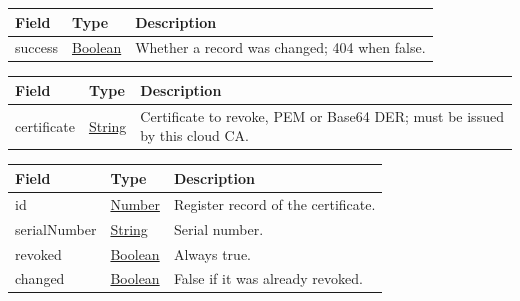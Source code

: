 \documentclass[a4paper]{arrowhead}
\newcommand{\pref}[1]{{\textcolor{ArrowheadGrey}{\hyperref[sec:model:primitives:#1]{#1}}}}
\begin{document}




\noindent\begin{tabularx}{\textwidth}{| >{\raggedright\arraybackslash}p{3.9cm} | >{\raggedright\arraybackslash\small}p{5.3cm} | X |} \hline
\rowcolor{gray!33} Field & Type & Description \\ \hline
success & \pref{Boolean} & Whether a record was changed; 404 when false. \\ \hline
\end{tabularx}







\noindent\begin{tabularx}{\textwidth}{| >{\raggedright\arraybackslash}p{3.9cm} | >{\raggedright\arraybackslash\small}p{5.3cm} | X |} \hline
\rowcolor{gray!33} Field & Type & Description \\ \hline
certificate & \pref{String} & Certificate to revoke, PEM or Base64 DER; must be issued by this cloud CA. \\ \hline
\end{tabularx}







\noindent\begin{tabularx}{\textwidth}{| >{\raggedright\arraybackslash}p{3.9cm} | >{\raggedright\arraybackslash\small}p{5.3cm} | X |} \hline
\rowcolor{gray!33} Field & Type & Description \\ \hline
id & \pref{Number} & Register record of the certificate. \\ \hline
serial\allowbreak{}Number & \pref{String} & Serial number. \\ \hline
revoked & \pref{Boolean} & Always true. \\ \hline
changed & \pref{Boolean} & False if it was already revoked. \\ \hline
\end{tabularx}



\end{document}
